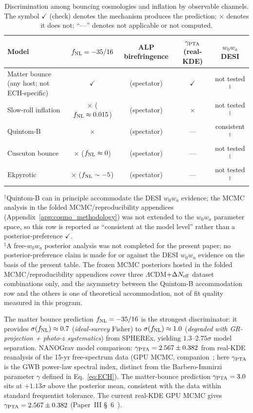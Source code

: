 \documentclass[aps,prd,twocolumn,superscriptaddress,showpacs,preprintnumbers,nofootinbib,longbibliography,floatfix]{revtex4-2}
\newcommand{\fnl}{f_{\rm NL}}
\begin{document}
\begin{table}[tb]
\caption{\label{tab:bounce_disc} Discrimination among bouncing cosmologies and
inflation by observable channels. The symbol $\checkmark$ (check) denotes the
mechanism produces the prediction; $\times$ denotes it does not; ``---'' denotes
not applicable or not computed.}
\begin{ruledtabular}
\begin{tabular}{lcccc}
Model & $\fnl=-35/16$ & ALP birefringence & $\gamma_{\rm PTA}$ (real-KDE) & $w_0w_a$ DESI \\
\hline
Matter bounce (any host; not ECH-specific) & $\checkmark$ & (spectator) & $\checkmark$ & not tested$^{\ddagger}$ \\
Slow-roll inflation & $\times$ ($\fnl\approx 0.015$) & (spectator) & $\times$ & not tested$^{\ddagger}$ \\
Quintom-B & $\times$ & (spectator) & --- & consistent$^{\dagger}$ \\
Cuscuton bounce & $\times$ ($\fnl\approx 0$) & (spectator) & --- & not tested$^{\ddagger}$ \\
Ekpyrotic & $\times$ ($\fnl\sim -5$) & (spectator) & --- & not tested$^{\ddagger}$ \\
\end{tabular}
\end{ruledtabular}
$^{\dagger}$Quintom-B can in principle accommodate the DESI $w_0 w_a$ evidence; the MCMC analysis in the folded MCMC/reproducibility appendices (Appendix~\ref{app:cosmo_methodology}) was not extended to the $w_0 w_a$ parameter space, so this row is reported as ``consistent at the model level'' rather than a posterior-preference $\checkmark$.\\
$^{\ddagger}$A free-$w_0 w_a$ posterior analysis was not completed for the present paper; no posterior-preference claim is made for or against the DESI $w_0 w_a$ evidence on the basis of the present table. The frozen MCMC posteriors hosted in the folded MCMC/reproducibility appendices cover three $\Lambda$CDM$+\Delta N_{\rm eff}$ dataset combinations only, and the asymmetry between the Quintom-B accommodation row and the others is one of theoretical accommodation, not of fit quality measured in this program.
\end{table}

The matter bounce prediction $\fnl = -35/16$ is the strongest discriminator:
it provides $\sigma(\fnl)\approx 0.7$ (\emph{ideal-survey} Fisher) to
$\sigma(\fnl)\approx 1.0$ (\emph{degraded with GR-projection + photo-$z$
systematics}) from SPHEREx, yielding $1.3$--$2.75\sigma$ model separation.
NANOGrav model comparison: $\gamma_{\rm PTA} = 2.567\pm 0.382$ from real-KDE reanalysis
of the 15-yr free-spectrum data (GPU MCMC, companion~\cite{Golden2026P3};
here $\gamma_{\rm PTA}$ is the GWB power-law spectral index, distinct from the Barbero-Immirzi parameter $\gamma$ defined in Eq.~\ref{eq:ECH}).
The matter-bounce prediction $\gamma_{\rm PTA}=3.0$ sits at $+1.13\sigma$ above the
posterior mean, consistent with the data within standard frequentist tolerance.
The current real-KDE GPU MCMC gives $\gamma_{\rm PTA} = 2.567\pm 0.382$
(Paper~III \S~6~\cite{Golden2026P3}).
\end{document}
